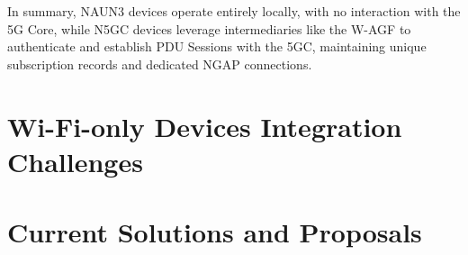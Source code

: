 In summary, NAUN3 devices operate entirely locally, with no interaction with the 5G Core, while N5GC devices leverage intermediaries like the W-AGF to authenticate and establish PDU Sessions with the 5GC, maintaining unique subscription records and dedicated NGAP connections.


\section{Wi-Fi-only Devices Integration Challenges}

\section{Current Solutions and Proposals}